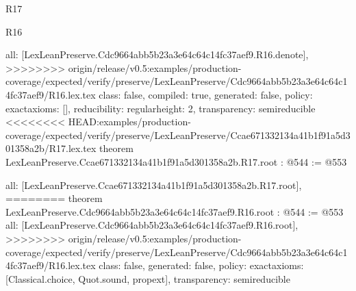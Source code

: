 \begin{lexlean}{R17}
\begin{lexlean}{R16}
\begin{coremodule}
{{{{{  all: [LexLeanPreserve.Cdc9664abb5b23a3e64c64c14fc37aef9.R16.denote],
>>>>>>>> origin/release/v0.5:examples/production-coverage/expected/verify/preserve/LexLeanPreserve/Cdc9664abb5b23a3e64c64c14fc37aef9/R16.lex.tex
  class: false,
  compiled: true,
  generated: false,
  policy: exact{axioms: []},
  reducibility: regular{height: 2},
  transparency: semireducible
}
<<<<<<<< HEAD:examples/production-coverage/expected/verify/preserve/LexLeanPreserve/Ccae671332134a41b1f91a5d301358a2b/R17.lex.tex
theorem LexLeanPreserve.Ccae671332134a41b1f91a5d301358a2b.R17.root : @544 := @553 {
  all: [LexLeanPreserve.Ccae671332134a41b1f91a5d301358a2b.R17.root],
========
theorem LexLeanPreserve.Cdc9664abb5b23a3e64c64c14fc37aef9.R16.root : @544 := @553 {
  all: [LexLeanPreserve.Cdc9664abb5b23a3e64c64c14fc37aef9.R16.root],
>>>>>>>> origin/release/v0.5:examples/production-coverage/expected/verify/preserve/LexLeanPreserve/Cdc9664abb5b23a3e64c64c14fc37aef9/R16.lex.tex
  class: false,
  generated: false,
  policy: exact{axioms: [Classical.choice, Quot.sound, propext]},
  transparency: semireducible
}

}}}}}
\end{coremodule}
\end{lexlean}
\end{lexlean}

